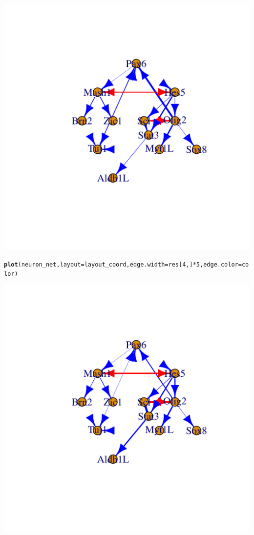 \documentclass[10pt,oneside]{article}\usepackage[]{graphicx}\usepackage[]{color}
\makeatletter
\def\maxwidth{ %
  \ifdim\Gin@nat@width>\linewidth
    \linewidth
  \else
    \Gin@nat@width
  \fi
}
\newcommand{\hlnum}[1]{\textcolor[rgb]{0.686,0.059,0.569}{#1}}%
\newcommand{\hlopt}[1]{\textcolor[rgb]{0,0,0}{#1}}%
\newcommand{\hlstd}[1]{\textcolor[rgb]{0.345,0.345,0.345}{#1}}%
\newcommand{\hlkwc}[1]{\textcolor[rgb]{0.333,0.667,0.333}{#1}}%
\newcommand{\hlkwd}[1]{\textcolor[rgb]{0.737,0.353,0.396}{\textbf{#1}}}%
\newenvironment{kframe}{%
 \def\at@end@of@kframe{}%
 \ifinner\ifhmode%
  \def\at@end@of@kframe{\end{minipage}}%
  \begin{minipage}{\columnwidth}%
 \fi\fi%
 \def\FrameCommand##1{\hskip\@totalleftmargin \hskip-\fboxsep
 \colorbox{shadecolor}{##1}\hskip-\fboxsep
     \hskip-\linewidth \hskip-\@totalleftmargin \hskip\columnwidth}%
 \MakeFramed {\advance\hsize-\width
   \@totalleftmargin\z@ \linewidth\hsize
   \@setminipage}}%
 {\par\unskip\endMakeFramed%
 \at@end@of@kframe}
\newenvironment{knitrout}{}{} %
\makeatother
\begin{document}
\begin{knitrout}
{\centering \includegraphics[width=\maxwidth]{figure/plot_temporal_rdi-7} 

}


\begin{kframe}\begin{alltt}
\hlkwd{plot}\hlstd{(neuron_net,} \hlkwc{layout} \hlstd{= layout_coord,} \hlkwc{edge.width}\hlstd{=res[}\hlnum{4}\hlstd{, ]} \hlopt{*} \hlnum{5}\hlstd{,} \hlkwc{edge.color} \hlstd{= color)}
\end{alltt}
\end{kframe}

{\centering \includegraphics[width=\maxwidth]{figure/plot_temporal_rdi-8} 

}



\end{knitrout}
\end{document}

